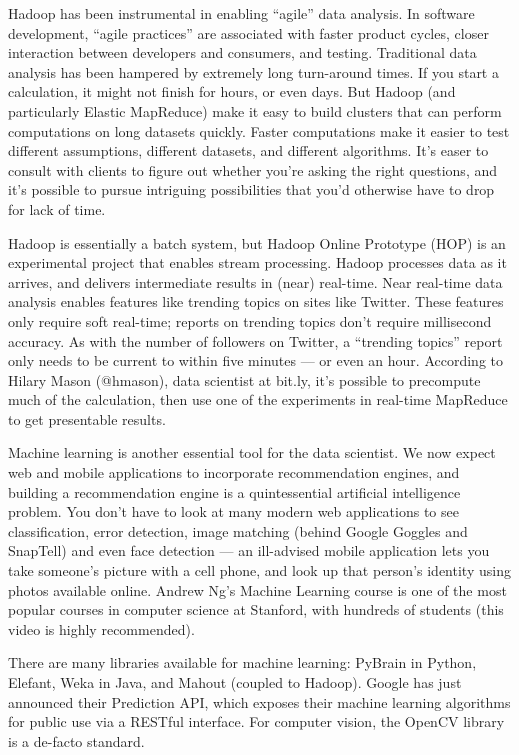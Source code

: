 Hadoop has been instrumental in enabling “agile” data analysis. In software development, “agile practices” are associated with faster product cycles, closer interaction between developers and consumers, and testing. Traditional data analysis has been hampered by extremely long turn-around times. If you start a calculation, it might not finish for hours, or even days. But Hadoop (and particularly Elastic MapReduce) make it easy to build clusters that can perform computations on long datasets quickly. Faster computations make it easier to test different assumptions, different datasets, and different algorithms. It’s easer to consult with clients to figure out whether you’re asking the right questions, and it’s possible to pursue intriguing possibilities that you’d otherwise have to drop for lack of time.

Hadoop is essentially a batch system, but Hadoop Online Prototype (HOP) is an experimental project that enables stream processing. Hadoop processes data as it arrives, and delivers intermediate results in (near) real-time. Near real-time data analysis enables features like trending topics on sites like Twitter. These features only require soft real-time; reports on trending topics don’t require millisecond accuracy. As with the number of followers on Twitter, a “trending topics” report only needs to be current to within five minutes — or even an hour. According to Hilary Mason (@hmason), data scientist at bit.ly, it’s possible to precompute much of the calculation, then use one of the experiments in real-time MapReduce to get presentable results.

Machine learning is another essential tool for the data scientist. We now expect web and mobile applications to incorporate recommendation engines, and building a recommendation engine is a quintessential artificial intelligence problem. You don’t have to look at many modern web applications to see classification, error detection, image matching (behind Google Goggles and SnapTell) and even face detection — an ill-advised mobile application lets you take someone’s picture with a cell phone, and look up that person’s identity using photos available online. Andrew Ng’s Machine Learning course is one of the most popular courses in computer science at Stanford, with hundreds of students (this video is highly recommended).

There are many libraries available for machine learning: PyBrain in Python, Elefant, Weka in Java, and Mahout (coupled to Hadoop). Google has just announced their Prediction API, which exposes their machine learning algorithms for public use via a RESTful interface. For computer vision, the OpenCV library is a de-facto standard.

